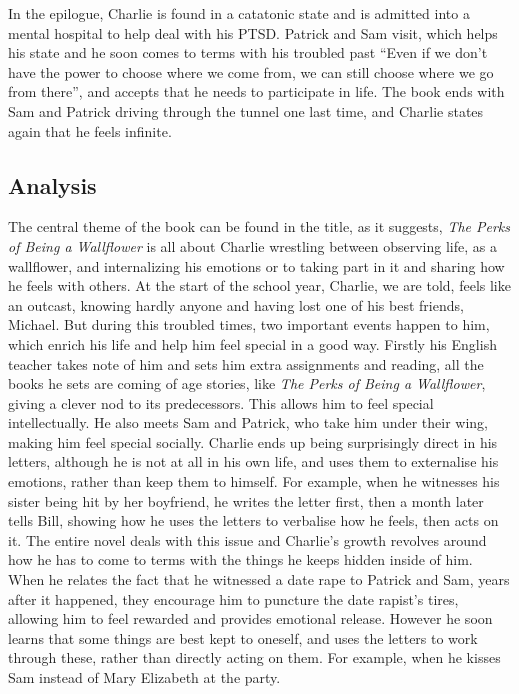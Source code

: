 	In the epilogue, Charlie is found in a catatonic state and is admitted into a mental hospital to help deal with his PTSD. Patrick and Sam visit, which helps his state and he soon comes to terms with his troubled past ``Even if we don't have the power to choose where we come from, we can still choose where we go from there'', and accepts that he needs to participate in life. The book ends with Sam and Patrick driving through the tunnel one last time, and Charlie states again that he feels infinite.

\subsection{Analysis}

	The central theme of the book can be found in the title, as it suggests, \textit{The Perks of Being a Wallflower} is all about Charlie wrestling between observing life, as a wallflower, and internalizing his emotions or to taking part in it and sharing how he feels with others. At the start of the school year, Charlie, we are told, feels like an outcast, knowing hardly anyone and having lost one of his best friends, Michael. But during this troubled times, two important events happen to him, which enrich his life and help him feel special in a good way. Firstly his English teacher takes note of him and sets him extra assignments and reading, all the books he sets are coming of age stories, like \textit{The Perks of Being a Wallflower}, giving a clever nod to its predecessors. This allows him to feel special intellectually. He also meets Sam and Patrick, who take him under their wing, making him feel special socially. Charlie ends up being surprisingly direct in his letters, although he is not at all in his own life, and uses them to externalise his emotions, rather than keep them to himself. For example, when he witnesses his sister being hit by her boyfriend, he writes the letter first, then a month later tells Bill, showing how he uses the letters to verbalise how he feels, then acts on it. The entire novel deals with this issue and Charlie's growth revolves around how he has to come to terms with the things he keeps hidden inside of him. When he relates the fact that he witnessed a date rape to Patrick and Sam, years after it happened, they encourage him to puncture the date rapist's tires, allowing him to feel rewarded and provides emotional release. However he soon learns that some things are best kept to oneself, and uses the letters to work through these, rather than directly acting on them. For example, when he kisses Sam instead of Mary Elizabeth at the party.

